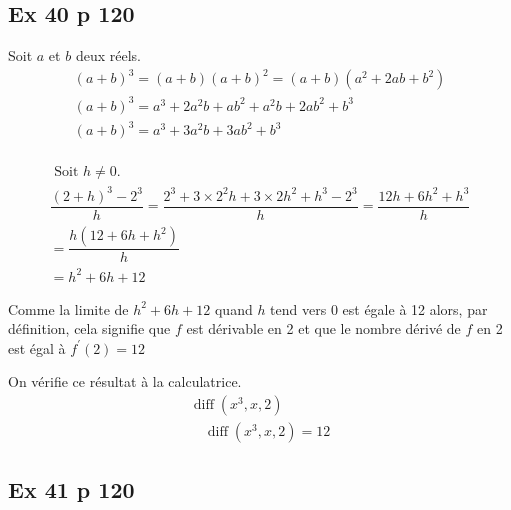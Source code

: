 \documentclass[12pt,a4paper]{book}
\begin{document}
\subsection*{Ex 40 p 120}

\begin{enumMet}
\item Soit $a$ et $b$ deux réels.
$$
\begin{array}{l}
(a+b)^{3}=(a+b)(a+b)^{2}=(a+b)\left(a^{2}+2 a b+b^{2}\right) \\
(a+b)^{3}=a^{3}+2 a^{2} b+a b^{2}+a^{2} b+2 a b^{2}+b^{3} \\
(a+b)^{3}=a^{3}+3 a^{2} b+3 a b^{2}+b^{3} \\
\end{array}
$$
\item $$
\begin{array}{l}
\text { Soit } h \neq 0.\\
\dfrac{(2+h)^{3}-2^{3}}{h}=\dfrac{2^{3}+3 \times 2^{2} h+3 \times 2 h^{2}+h^{3}-2^{3}}{h}=\dfrac{12 h+6 h^{2}+h^{3}}{h} \\
=\dfrac{h\left(12+6 h+h^{2}\right)}{h} \\
=h^{2}+6 h+12
\end{array}
$$
\item Comme la limite de $h^{2}+6 h+12$ quand $h$ tend vers 0 est égale à 12 alors, par définition, cela signifie que $f$ est dérivable en 2 et que le nombre dérivé de $f$ en 2 est égal à $f^{\prime}(2)=12$
\item On vérifie ce résultat à la calculatrice.
$$
\begin{array}{l}
\operatorname{diff}\left(x^{3}, x, 2\right) \\
\quad \operatorname{diff}\left(x^{3}, x, 2\right) = 12
\end{array}
$$
\end{enumMet}

\subsection*{Ex 41 p 120}
\end{document}
